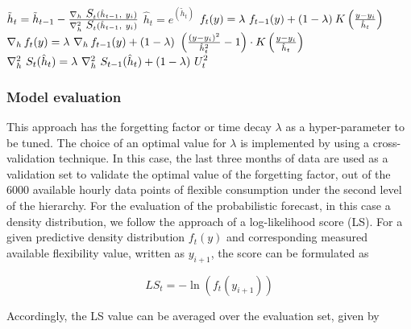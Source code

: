 \begin{algorithm}[]
\begin{spacing}{1.7}
\begin{algorithmic}[1]
                \STATE $\tilde{h}_t = \tilde{h}_{t-1} - \frac{ \nabla_h \ \mathlarger{S}_t (\hat{h}_{t-1},\ y_i) }{\nabla^2_h \ \mathlarger{S}_t (\hat{h}_{t-1},\ y_i)}$
        \ENDIF 
     \STATE $\hat{h}_t = e^{(\tilde{h}_{t})}$ %
     \STATE  $f_{t}(y) = \lambda\ f_{t-1}(y) + (1-\lambda) \: \mathlarger{K}\left(\frac{y - y_{i}}{\hat{h}_{t}}\right)$ \\ %
     \STATE $\nabla_h \, f_t (y) = \lambda \ \nabla_h \,f_{t-1}(y) + (1-\lambda) \ \left(\frac{(y - y_{i})^2}{\hat{h}_{t}^2} - 1\right) \cdot \mathlarger{K}\left(\frac{y - y_{i}}{\hat{h}_{t}}\right) $ \\ %
     \STATE $\nabla^2_h \ \mathlarger{S}_t (\hat{h}_{t}) = \lambda \ \nabla^2_h \ \mathlarger{S}_{t-1} (\hat{h}_t) + (1-\lambda) \ \mathlarger{U}_t^2$\\ %
\ENDFOR
\end{algorithmic} 
\end{spacing}
\end{algorithm}
\subsubsection{Model evaluation}
This approach has the forgetting factor or time decay $\lambda$ as a hyper-parameter to be tuned. The choice of an optimal value for $\lambda$ is implemented by using a cross-validation technique. In this case, the last three months of data are used as a validation set to validate the optimal value of the forgetting factor, out of the 6000 available hourly data points of flexible consumption under the second level of the hierarchy. For the evaluation of the probabilistic forecast, in this case a density distribution, we follow the approach of a log-likelihood score (LS). For a given predictive density distribution $f_{t}(y)$ and corresponding measured available flexibility value, written as $y_{i+1}$, the score can be formulated as

\begin{equation}
    LS_{t} = - \ln \left(f_{t}(y_{i+1})\right)
\end{equation}

Accordingly, the LS value can be averaged over the evaluation set, given by 

